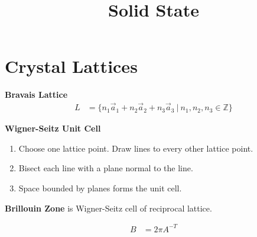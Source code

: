 \documentclass[12pt]{article}
\title{Solid State}
\date{}
\begin{document}
\maketitle

\section*{Crystal Lattices}

\textbf{Bravais Lattice}
\begin{align}
L &= \{n_1 \vec{a}_1 + n_2 \vec{a}_2 + n_3 \vec{a}_3 \ \lvert \ n_1, n_2, n_3 \in \mathbb{Z}\}
\end{align}

\noindent
\textbf{Wigner-Seitz Unit Cell}
\begin{enumerate}
  \item Choose one lattice point. Draw lines to every other lattice point.
  \item Bisect each line with a plane normal to the line.
  \item Space bounded by planes forms the unit cell.
\end{enumerate}

\noindent
\textbf{Brillouin Zone} is Wigner-Seitz cell of reciprocal lattice.

\begin{align}
  B &= 2\pi A^{-T}
\end{align}
\end{document}
